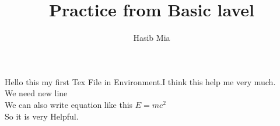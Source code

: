 \documentclass{article}
\author{Hasib Mia}
\title{Practice from Basic lavel}
\begin{document}
	\maketitle
	Hello this my first Tex File in \LaTeXe Environment.I think this help me very much.\\
	We need new line\\
	We can also write equation  like this $E=mc^2$\\
	So it is very Helpful.
\end{document}
